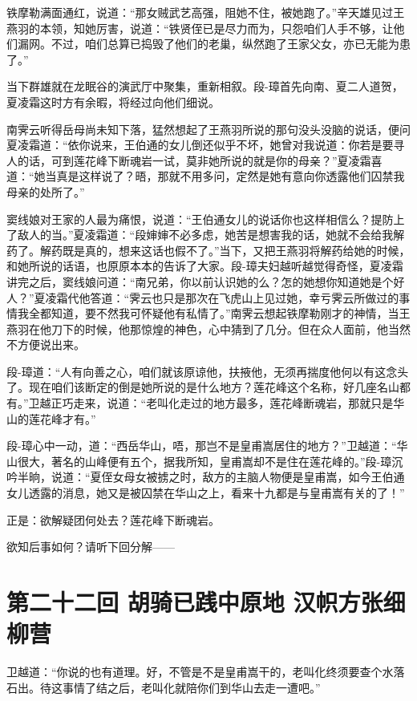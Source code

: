 \documentclass[12pt,oneside]{book}
\begin{document}
铁摩勒满面通红，说道：``那女贼武艺高强，阻她不住，被她跑了。''辛天雄见过王燕羽的本领，知她厉害，说道：``铁贤侄已是尽力而为，只怨咱们人手不够，让他们漏网。不过，咱们总算已捣毁了他们的老巢，纵然跑了王家父女，亦已无能为患了。''

当下群雄就在龙眠谷的演武厅中聚集，重新相叙。段-璋首先向南、夏二人道贺，夏凌霜这时方有余暇，将经过向他们细说。

南霁云听得岳母尚未知下落，猛然想起了王燕羽所说的那句没头没脑的说话，便问夏凌霜道：``依你说来，王伯通的女儿倒还似乎不坏，她曾对我说道：你若是要寻人的话，可到莲花峰下断魂岩一试，莫非她所说的就是你的母亲？''夏凌霜喜道：``她当真是这样说了？晤，那就不用多问，定然是她有意向你透露他们囚禁我母亲的处所了。''

窦线娘对王家的人最为痛恨，说道：``王伯通女儿的说话你也这样相信么？提防上了敌人的当。''夏凌霜道：``段婶婶不必多虑，她苦是想害我的话，她就不会给我解药了。解药既是真的，想来这话也假不了。''当下，又把王燕羽将解药给她的时候，和她所说的话语，也原原本本的告诉了大家。段-璋夫妇越听越觉得奇怪，夏凌霜讲完之后，窦线娘问道：``南兄弟，你以前认识她的么？怎的她想你知道她是个好人？''夏凌霜代他答道：``霁云也只是那次在飞虎山上见过她，幸亏霁云所做过的事情我全都知道，要不然我可怀疑他有私情了。''南霁云想起铁摩勒刚才的神情，当王燕羽在他刀下的时候，他那惊煌的神色，心中猜到了几分。但在众人面前，他当然不方便说出来。

段-璋道：``人有向善之心，咱们就该原谅他，扶掖他，无须再揣度他何以有这念头了。现在咱们该断定的倒是她所说的是什么地方？莲花峰这个名称，好几座名山都有。''卫越正巧走来，说道：``老叫化走过的地方最多，莲花峰断魂岩，那就只是华山的莲花峰才有。''

段-璋心中一动，道：``西岳华山，唔，那岂不是皇甫嵩居住的地方？''卫越道：``华山很大，著名的山峰便有五个，据我所知，皇甫嵩却不是住在莲花峰的。''段-璋沉吟半晌，说道：``夏侄女母女被掳之时，敌方的主脑人物便是皇甫嵩，如今王伯通女儿透露的消息，她又是被囚禁在华山之上，看来十九都是与皇甫嵩有关的了！''

正是：欲解疑团何处去？莲花峰下断魂岩。

欲知后事如何？请听下回分解------

\chapter{第二十二回 胡骑已践中原地
汉帜方张细柳营}\label{ux7b2cux4e8cux5341ux4e8cux56de-ux80e1ux9a91ux5df2ux8df5ux4e2dux539fux5730-ux6c49ux5e1cux65b9ux5f20ux7ec6ux67f3ux8425}

卫越道：``你说的也有道理。好，不管是不是皇甫嵩干的，老叫化终须要查个水落石出。待这事情了结之后，老叫化就陪你们到华山去走一遭吧。''
\end{document}
